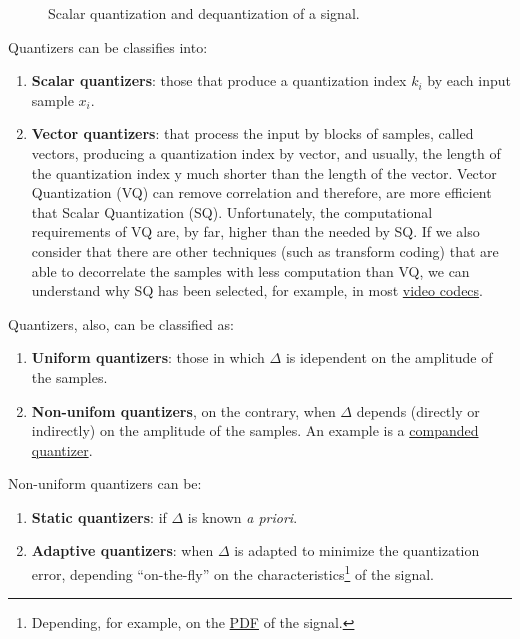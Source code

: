 \begin{figure}
  \centering
  \caption{Scalar quantization and dequantization of a signal.}
  \label{fig:Q}
\end{figure}

Quantizers can be classifies into:
\begin{enumerate}
\item \textbf{Scalar quantizers}: those that produce a quantization
  index $k_i$ by each input sample $x_i$.
\item \textbf{Vector quantizers}: that process the input by blocks of
  samples, called vectors, producing a quantization index by vector,
  and usually, the length of the quantization index y much shorter
  than the length of the vector. Vector Quantization (VQ) can remove
  correlation and therefore, are more efficient that Scalar
  Quantization (SQ). Unfortunately, the computational requirements of VQ
  are, by far, higher than the needed by SQ. If we also consider that
  there are other techniques (such as transform coding) that are able
  to decorrelate the samples with less computation than VQ, we can
  understand why SQ has been selected, for example, in
  most \href{https://en.wikipedia.org/wiki/Video_coding_format}{video
  codecs}.
\end{enumerate}

Quantizers, also, can be classified as:
\begin{enumerate}
\item \textbf{Uniform quantizers}: those in which $\Delta$ is
  idependent on the amplitude of the samples.
\item \textbf{Non-unifom quantizers}, on the contrary, when $\Delta$
  depends (directly or indirectly) on the amplitude of the samples. An
  example is a
  \href{https://en.wikipedia.org/wiki/Companding}{companded
    quantizer}.
\end{enumerate}

Non-uniform quantizers can be:
\begin{enumerate}
\item \textbf{Static quantizers}: if $\Delta$ is known \emph{a
priori}.
\item \textbf{Adaptive quantizers}: when $\Delta$ is adapted to
  minimize the quantization error, depending ``on-the-fly'' on the
  characteristics\footnote{Depending, for example, on the
    \href{https://en.wikipedia.org/wiki/Probability_density_function}{PDF}
    of the signal.} of the signal.
\end{enumerate}

